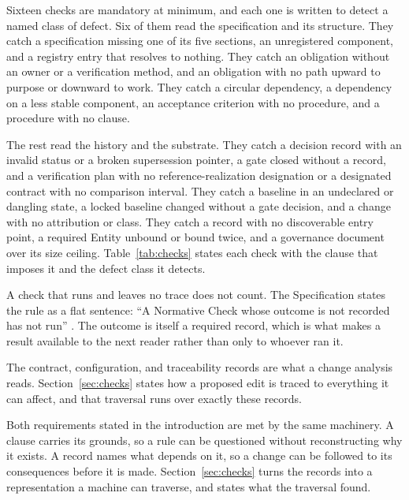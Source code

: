 Sixteen checks are mandatory at minimum, and each one is written to detect a named class of defect. Six of them read the specification and its structure. They catch a specification missing one of its five sections, an unregistered component, and a registry entry that resolves to nothing. They catch an obligation without an owner or a verification method, and an obligation with no path upward to purpose or downward to work. They catch a circular dependency, a dependency on a less stable component, an acceptance criterion with no procedure, and a procedure with no clause.

The rest read the history and the substrate. They catch a decision record with an invalid status or a broken supersession pointer, a gate closed without a record, and a verification plan with no reference-realization designation or a designated contract with no comparison interval. They catch a baseline in an undeclared or dangling state, a locked baseline changed without a gate decision, and a change with no attribution or class. They catch a record with no discoverable entry point, a required Entity unbound or bound twice, and a governance document over its size ceiling. Table~\ref{tab:checks} states each check with the clause that imposes it and the defect class it detects.

A check that runs and leaves no trace does not count. The Specification states the rule as a flat sentence: ``A Normative Check whose outcome is not recorded has not run'' \citep[Section~\hyperlink{nss-16.3}{16.3}]{pss2026}. The outcome is itself a required record, which is what makes a result available to the next reader rather than only to whoever ran it.

The contract, configuration, and traceability records are what a change analysis reads. Section~\ref{sec:checks} states how a proposed edit is traced to everything it can affect, and that traversal runs over exactly these records.

Both requirements stated in the introduction are met by the same machinery. A clause carries its grounds, so a rule can be questioned without reconstructing why it exists. A record names what depends on it, so a change can be followed to its consequences before it is made. Section~\ref{sec:checks} turns the records into a representation a machine can traverse, and states what the traversal found.
